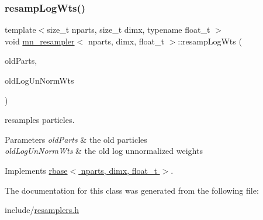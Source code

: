 \subsubsection{\texorpdfstring{resamp\+Log\+Wts()}{resampLogWts()}}
{\footnotesize\ttfamily template$<$size\+\_\+t nparts, size\+\_\+t dimx, typename float\+\_\+t $>$ \\
void \hyperlink{classmn__resampler}{mn\+\_\+resampler}$<$ nparts, dimx, float\+\_\+t $>$\+::resamp\+Log\+Wts (\begin{DoxyParamCaption}\item[{\hyperlink{classrbase_aa12fc826befa6ba0647b5f59ebc396ee}{array\+Vec} \&}]{old\+Parts,  }\item[{\hyperlink{classrbase_a6f76bef853e508cb5b6f546d231b06f5}{array\+Float} \&}]{old\+Log\+Un\+Norm\+Wts }\end{DoxyParamCaption})\hspace{0.3cm}{\ttfamily [virtual]}}



resamples particles. 


\begin{DoxyParams}{Parameters}
{\em old\+Parts} & the old particles \\
\hline
{\em old\+Log\+Un\+Norm\+Wts} & the old log unnormalized weights \\
\hline
\end{DoxyParams}


Implements \hyperlink{classrbase_aff0f6f88fd4656e67f5ebc870f10dd44}{rbase$<$ nparts, dimx, float\+\_\+t $>$}.



The documentation for this class was generated from the following file\+:\begin{DoxyCompactItemize}
\item 
include/\hyperlink{resamplers_8h}{resamplers.\+h}\end{DoxyCompactItemize}

